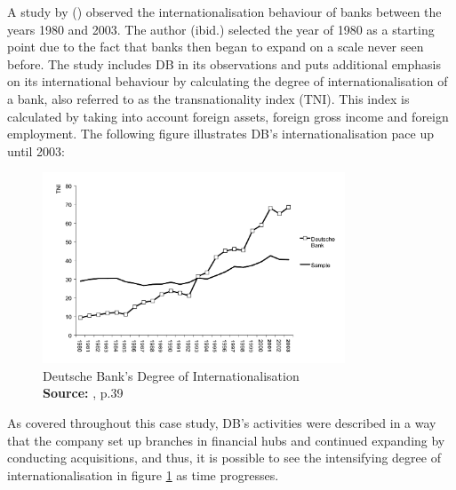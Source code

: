 \documentclass[11pt,a4paper]{article}
\newcommand*{\captionsource}[2]{%
  \caption[{#1}]{%
    #1%
    \\\hspace{\linewidth}%
    \textbf{Source:} #2%
  }%
}
\begin{document}
{{A study by \citeauthor{slagerInternationalizationBanksStrategic2005} (\citeyear{slagerInternationalizationBanksStrategic2005}) observed the internationalisation behaviour of banks between the years 1980 and 2003. The author (ibid.) selected the year of 1980 as a starting point due to the fact that banks then began to expand on a scale never seen before. The study includes DB in its observations and puts additional emphasis on its international behaviour by calculating the degree of internationalisation of a bank, also referred to as the transnationality index (TNI). This index is calculated by taking into account foreign assets, foreign gross income and foreign employment. The following figure illustrates DB's internationalisation pace up until 2003:

  \vspace{5mm}
\begin{figure}[H]
	\centering
  \includegraphics[width=90mm]{figures/fig_db_internationalisation}
  \vspace{5mm}
    \captionsetup{justification=centering,margin=2cm}
      \captionsource{Deutsche Bank's Degree of Internationalisation}{\cite{slagerInternationalizationBanksStrategic2005}, p.39}
	\label{fig:db_international}
\end{figure}

As covered throughout this case study, DB's activities were described in a way that the company set up branches in financial hubs and continued expanding by conducting acquisitions, and thus, it is possible to see the intensifying degree of internationalisation in figure \ref{fig:db_international} as time progresses.

\vspace{-2mm}
}}
\end{document}
